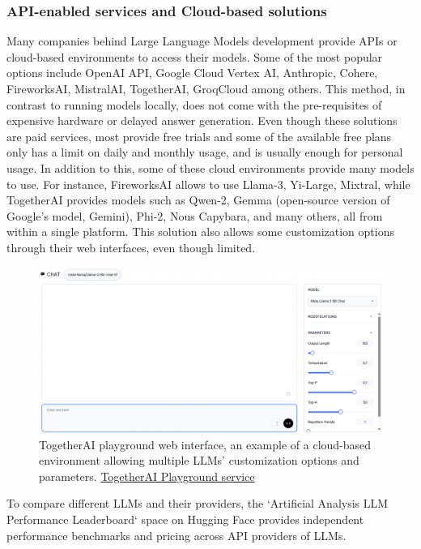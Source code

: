 \subsubsection*{API-enabled services and Cloud-based solutions}
Many companies behind Large Language Models development provide APIs or cloud-based environments to access their models. Some of the most popular options include OpenAI API, Google Cloud Vertex AI, Anthropic, Cohere, FireworksAI, MistralAI, TogetherAI, GroqCloud among others.\newline
This method, in contrast to running models locally, does not come with the pre-requisites of expensive hardware or delayed answer generation. Even though these solutions are paid services, most provide free trials and some of the available free plans only has a limit on daily and monthly usage, and is usually enough for personal usage. In addition to this, some of these cloud environments provide many models to use. For instance, FireworksAI allows to use Llama-3, Yi-Large, Mixtral, while TogetherAI provides models such as Qwen-2, Gemma (open-source version of Google's model, Gemini), Phi-2, Nous Capybara, and many others, all from within a single platform.
This solution also allows some customization options through their web interfaces, even though limited.
\begin{figure}[htbp]
    \centering
    \includegraphics[width=\linewidth]{./figures/togetherai-playground.png}
    \caption{TogetherAI playground web interface, an example of a cloud-based environment allowing multiple LLMs' customization options and parameters. \href{https://api.together.ai/playground}{TogetherAI Playground service}}
\end{figure}\newline
To compare different LLMs and their providers, the `Artificial Analysis LLM Performance Leaderboard` space on Hugging Face provides independent performance benchmarks and pricing across API providers of LLMs.
